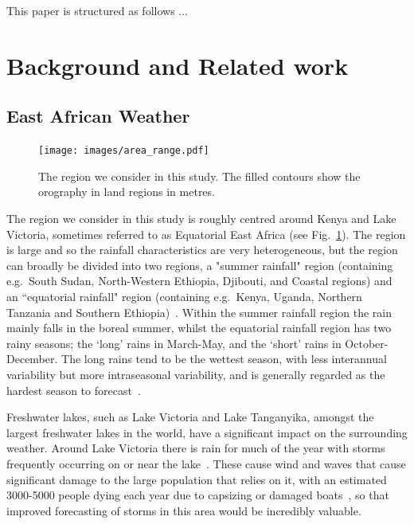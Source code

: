 \documentclass{article}
\begin{document}
This paper is structured as follows ... 

\section{Background and Related work}

\subsection{East African Weather}


\begin{figure}[t]
    \centering
    \texttt{[image: images/area\_range.pdf]}
    
    \caption{The region we consider in this study. The filled contours show the orography in land regions in metres.}
    \label{fig:region}
\end{figure}

The region we consider in this study is roughly centred around Kenya and Lake Victoria, sometimes referred to as Equatorial East Africa (see Fig.~\ref{fig:region}). The region is large and so the rainfall characteristics are very heterogeneous, but the region can broadly be divided into two regions, a "summer rainfall" region (containing e.g.~South Sudan, North-Western Ethiopia, Djibouti, and Coastal regions) and an ``equatorial rainfall" region (containing e.g.~Kenya, Uganda, Northern Tanzania and Southern Ethiopia)~\citep{nicholson_climate_2017}. Within the summer rainfall region the rain mainly falls in the boreal summer, whilst the equatorial rainfall region has two rainy seasons; the `long' rains in March-May, and the `short' rains in October-December. The long rains tend to be the wettest season, with less interannual variability but more intraseasonal variability, and is generally regarded as the hardest season to forecast~\citep{nicholson_climate_2017, walker_skill_2019, kilavi_extreme_2018}.

Freshwater lakes, such as Lake Victoria and Lake Tanganyika, amongst the largest freshwater lakes in the world, have a significant impact on the surrounding weather. Around Lake Victoria there is rain for much of the year with storms frequently occurring on or near the lake~\citep{macleod_drivers_2021, chamberlain_forecasting_2014, woodhams_identifying_2019}. These cause wind and waves that cause significant damage to the large population that relies on it, with an estimated 3000-5000 people dying each year due to capsizing or damaged boats~\citep{ifrc_world_2014}, so that improved forecasting of storms in this area would be incredibly valuable. 
\end{document}
